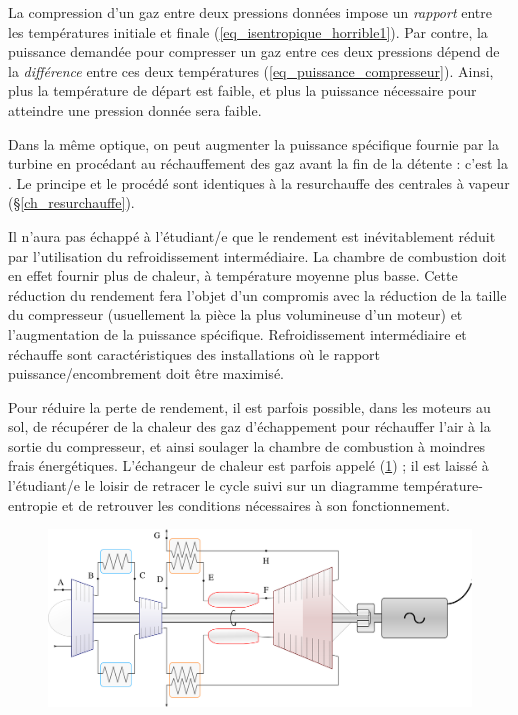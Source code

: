 {{		La compression d’un gaz entre deux pressions données impose un \emph{rapport} entre les températures initiale et finale (\ref{eq_isentropique_horrible1}). Par contre, la puissance demandée pour compresser un gaz entre ces deux pressions dépend de la \emph{différence} entre ces deux températures (\ref{eq_puissance_compresseur}). Ainsi, plus la température de départ est faible, et plus la puissance nécessaire pour atteindre une pression donnée sera faible.

		Dans la même optique, on peut augmenter la puissance spécifique fournie par la turbine en procédant au réchauffement des gaz avant la fin de la détente : c’est la . Le principe et le procédé sont identiques à la resurchauffe des centrales à vapeur (\S\ref{ch_resurchauffe}).

		Il n’aura pas échappé à l’étudiant/e que le rendement est inévitablement réduit par l’utilisation du refroidissement intermédiaire. La chambre de combustion doit en effet fournir plus de chaleur, à température moyenne plus basse. Cette réduction du rendement fera l’objet d’un compromis avec la réduction de la taille du compresseur (usuellement la pièce la plus volumineuse d’un moteur) et l’augmentation de la puissance spécifique. Refroidissement intermédiaire et réchauffe sont caractéristiques des installations où le rapport puissance/encombrement doit être maximisé.

		Pour réduire la perte de rendement, il est parfois possible, dans les moteurs au sol, de récupérer de la chaleur des gaz d’échappement pour réchauffer l’air à la sortie du compresseur, et ainsi soulager la chambre de combustion à moindres frais énergétiques. L’échangeur de chaleur est parfois appelé  (\cref{fig_intercooler_echangeur}) ; il est laissé à l’étudiant/e le loisir de retracer le cycle suivi sur un diagramme température-entropie et de retrouver les conditions nécessaires à son fonctionnement.
		
		\begin{figure}
			\begin{center}
				\includegraphics[scale=0.6]{images/circuit_intercooler_echangeur.png}
			\end{center}
			\label{fig_intercooler_echangeur}
		\end{figure}

}}
